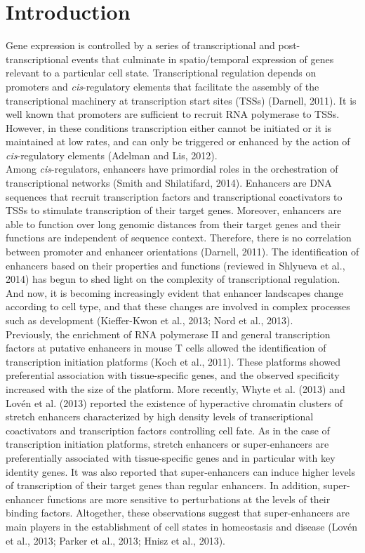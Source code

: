 \section{Introduction}

	Gene expression is controlled by a series of transcriptional and post-transcriptional events that culminate in spatio/temporal expression of genes relevant to a particular cell state. Transcriptional regulation depends on promoters and \textit{cis}-regulatory elements that facilitate the assembly of the transcriptional machinery at transcription start sites (TSSs) (Darnell, 2011). It is well known that promoters are sufficient to recruit RNA polymerase to TSSs. However, in these conditions transcription either cannot be initiated or it is maintained at low rates, and can only be triggered or enhanced by the action of \textit{cis}-regulatory elements (Adelman and Lis, 2012).\\

	Among \textit{cis}-regulators, enhancers have primordial roles in the orchestration of transcriptional networks (Smith and Shilatifard, 2014). Enhancers are DNA sequences that recruit transcription factors and transcriptional coactivators to TSSs to stimulate transcription of their target genes. Moreover, enhancers are able to function over long genomic distances from their target genes and their functions are independent of sequence context. Therefore, there is no correlation between promoter and enhancer orientations (Darnell, 2011). The identification of enhancers based on their properties and functions (reviewed in Shlyueva et al., 2014) has begun to shed light on the complexity of transcriptional regulation. And now, it is becoming increasingly evident that enhancer landscapes change according to cell type, and that these changes are involved in complex processes such as development (Kieffer-Kwon et al., 2013; Nord et al., 2013).\\

	Previously, the enrichment of RNA polymerase II and general transcription factors at putative enhancers in mouse T cells allowed the identification of transcription initiation platforms (Koch et al., 2011). These platforms showed preferential association with tissue-specific genes, and the observed specificity increased with the size of the platform. More recently, Whyte et al. (2013) and Lov\'en et al. (2013) reported the existence of hyperactive chromatin clusters of stretch enhancers characterized by high density levels of transcriptional coactivators and transcription factors controlling cell fate. As in the case of transcription initiation platforms, stretch enhancers or super-enhancers are preferentially associated with tissue-specific genes and in particular with key identity genes. It was also reported that super-enhancers can induce higher levels of transcription of their target genes than regular enhancers. In addition, super-enhancer functions are more sensitive to perturbations at the levels of their binding factors. Altogether, these observations suggest that super-enhancers are main players in the establishment of cell states in homeostasis and disease (Lov\'en et al., 2013; Parker et al., 2013; Hnisz et al., 2013).\\ 

